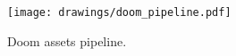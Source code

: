 \begin{figure}[H]
\centering
\texttt{[image: drawings/doom\_pipeline.pdf]}
\caption{Doom assets pipeline.}
\end{figure}
